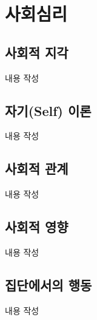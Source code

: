 \section{사회심리}

\subsection{사회적 지각}
내용 작성

\subsection{자기(Self) 이론}
내용 작성

\subsection{사회적 관계}
내용 작성

\subsection{사회적 영향}
내용 작성

\subsection{집단에서의 행동}
내용 작성

